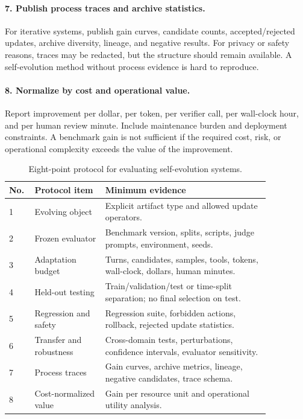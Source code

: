 \paragraph{7. Publish process traces and archive statistics.}
For iterative systems, publish gain curves, candidate counts, accepted/rejected updates, archive diversity, lineage, and negative results. For privacy or safety reasons, traces may be redacted, but the structure should remain available. A self-evolution method without process evidence is hard to reproduce.

\paragraph{8. Normalize by cost and operational value.}
Report improvement per dollar, per token, per verifier call, per wall-clock hour, and per human review minute. Include maintenance burden and deployment constraints. A benchmark gain is not sufficient if the required cost, risk, or operational complexity exceeds the value of the improvement.

\begin{table}[t]
\centering
\small
\caption{Eight-point protocol for evaluating self-evolution systems.}
\label{tab:eight-point-protocol}
\begin{tabular}{p{0.06\linewidth}p{0.24\linewidth}p{0.56\linewidth}}
\toprule
\textbf{No.} & \textbf{Protocol item} & \textbf{Minimum evidence} \\
\midrule
1 & Evolving object & Explicit artifact type and allowed update operators. \\
2 & Frozen evaluator & Benchmark version, splits, scripts, judge prompts, environment, seeds. \\
3 & Adaptation budget & Turns, candidates, samples, tools, tokens, wall-clock, dollars, human minutes. \\
4 & Held-out testing & Train/validation/test or time-split separation; no final selection on test. \\
5 & Regression and safety & Regression suite, forbidden actions, rollback, rejected update statistics. \\
6 & Transfer and robustness & Cross-domain tests, perturbations, confidence intervals, evaluator sensitivity. \\
7 & Process traces & Gain curves, archive metrics, lineage, negative candidates, trace schema. \\
8 & Cost-normalized value & Gain per resource unit and operational utility analysis. \\
\bottomrule
\end{tabular}
\end{table}

